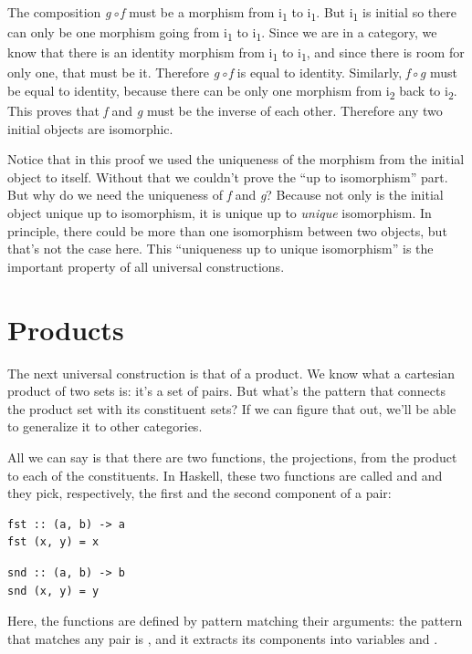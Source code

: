 \noindent
The composition \emph{g◦f} must be a morphism from i\textsubscript{1} to
i\textsubscript{1}. But i\textsubscript{1} is initial so there can only
be one morphism going from i\textsubscript{1} to i\textsubscript{1}.
Since we are in a category, we know that there is an identity morphism
from i\textsubscript{1} to i\textsubscript{1}, and since there is room
for only one, that must be it. Therefore \emph{g◦f} is equal to
identity. Similarly, \emph{f◦g} must be equal to identity, because there
can be only one morphism from i\textsubscript{2} back to
i\textsubscript{2}. This proves that \emph{f} and \emph{g} must be the
inverse of each other. Therefore any two initial objects are isomorphic.

Notice that in this proof we used the uniqueness of the morphism from
the initial object to itself. Without that we couldn't prove the ``up to
isomorphism'' part. But why do we need the uniqueness of \emph{f} and
\emph{g}? Because not only is the initial object unique up to
isomorphism, it is unique up to \emph{unique} isomorphism. In principle,
there could be more than one isomorphism between two objects, but that's
not the case here. This ``uniqueness up to unique isomorphism'' is the
important property of all universal constructions.

\section{Products}\label{products}

The next universal construction is that of a product. We know what a
cartesian product of two sets is: it's a set of pairs. But what's the
pattern that connects the product set with its constituent sets? If we
can figure that out, we'll be able to generalize it to other categories.

All we can say is that there are two functions, the projections, from
the product to each of the constituents. In Haskell, these two functions
are called  and  and they pick, respectively,
the first and the second component of a pair:

\begin{verbatim}
fst :: (a, b) -> a
fst (x, y) = x
\end{verbatim}

\begin{verbatim}
snd :: (a, b) -> b
snd (x, y) = y
\end{verbatim}
Here, the functions are defined by pattern matching their arguments: the
pattern that matches any pair is , and it extracts its
components into variables  and .

